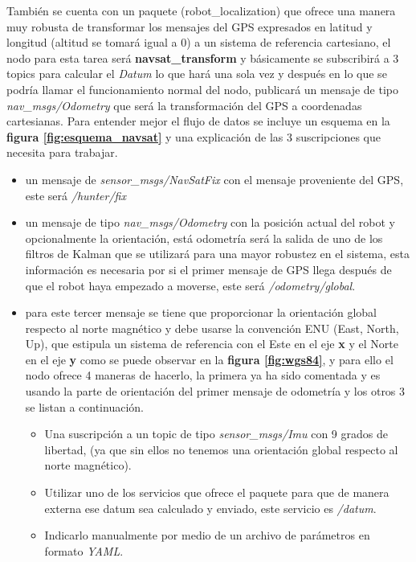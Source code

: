 También se cuenta con un paquete (robot\_localization) que 
ofrece una manera muy robusta de transformar los mensajes del GPS expresados en latitud y longitud (altitud se tomará igual a 0) a un 
sistema de referencia cartesiano, el nodo para esta tarea será \textbf{navsat\_transform} y básicamente se subscribirá a 3 topics para calcular 
el \textit{Datum} lo que hará una sola vez y después en lo que se podría llamar el funcionamiento normal del nodo, publicará un mensaje de tipo 
\textit{nav\_msgs/Odometry} que será la transformación del GPS a coordenadas cartesianas. Para entender mejor el flujo de datos se incluye 
un esquema en la \textbf{figura \ref{fig:esquema_navsat}} y una explicación de las 3 suscripciones que necesita para trabajar.

\begin{itemize}
    \item un mensaje de \textit{sensor\_msgs/NavSatFix} con el mensaje proveniente del GPS, este será \textit{/hunter/fix}
    \item un mensaje de tipo \textit{nav\_msgs/Odometry} con la posición actual del robot y opcionalmente la orientación, está odometría 
será la salida de uno de los filtros de Kalman que se utilizará para una mayor robustez en el sistema, esta información es necesaria por 
si el primer mensaje de GPS llega después de que el robot haya empezado a moverse, este será \textit{/odometry/global}.
    \item para este tercer mensaje se tiene que proporcionar la orientación global respecto al norte magnético y debe usarse la 
convención ENU (East, North, Up), que estipula un sistema de referencia con el Este en el eje \textbf{x} y el Norte en el eje \textbf{y} 
como se puede observar en la \textbf{figura \ref{fig:wgs84}}, y para ello el nodo ofrece 4 maneras de hacerlo, la primera ya ha sido 
comentada y es usando la parte de orientación del primer mensaje de odometría y los otros 3 se listan a continuación.
        \begin{itemize}
            \item Una suscripción a un topic de tipo \textit{sensor\_msgs/Imu} con 9 grados de libertad, (ya que sin ellos no tenemos una 
orientación global respecto al norte magnético).
            \item Utilizar uno de los servicios que ofrece el paquete para que de manera externa ese datum sea calculado y enviado, 
este servicio es \textit{/datum}.
            \item Indicarlo manualmente por medio de un archivo de parámetros en formato \textit{YAML}.
        \end{itemize}
\end{itemize}



